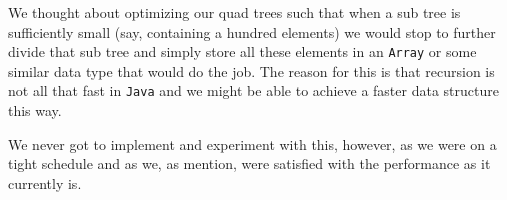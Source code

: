 We thought about optimizing our quad trees such that when a sub tree is sufficiently small (say, containing a hundred elements) we would stop to further divide that sub tree and simply store all these elements in an \texttt{Array} or some similar data type that would do the job. The reason for this is that recursion is not all that fast in \texttt{Java} and we might be able to achieve a faster data structure this way.

We never got to implement and experiment with this, however, as we were on a tight schedule and as we, as mention, were satisfied with the performance as it currently is.